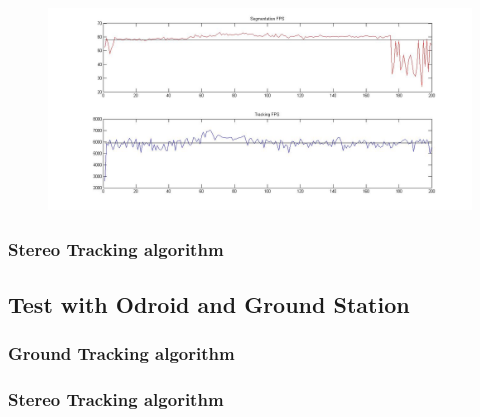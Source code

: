 	\begin{figure}[ht]
		\centering
		\includegraphics[width=\linewidth]{../Images/c4/fps}
		\caption{}
		\label{fig:fps_PC}
	\end{figure}
		
	\subsubsection{Stereo Tracking algorithm}
	

	
\subsection{Test with Odroid and Ground Station}

	\subsubsection{Ground Tracking algorithm}
	
	\subsubsection{Stereo Tracking algorithm}